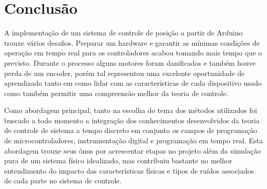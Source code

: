 \documentclass[a4paper,11pt]{article}
\begin{document}







\section{Conclusão}

A implementação de um sistema de controle de posição a partir de Arduino trouxe vários desafios. Preparar um hardware e garantir as mínimas condições de operação em tempo real para os controladores acabou tomando mais tempo que o previsto. Durante o processo alguns motores foram danificados e também houve perda de um encoder, porém tal representou uma excelente oportunidade de aprendizado tanto em como lidar com as características de cada dispositivo usado como também permitir uma compreensão melhor da teoria de controle.

Como abordagem principal, tanto na escolha do tema dos métodos utilizados foi buscado a todo momento a integração dos conhecimentos desenvolvidos da teoria de controle de sistema a tempo discreto em conjunto os campos de programação de microcontroladores, instrumentação digital e programação em tempo real. Esta abordagem trouxe seus ônus por acrescentar etapas no projeto além da simulação pura de um sistema físico idealizado, mas contribuiu bastante no melhor entendimento do impacto das características físicas e tipos de ruídos associados de cada parte no sistema de controle.


\newpage

\nocite{matlabcontrol}
\nocite{matlabsymbolic}
\nocite{ogata2010modern}
\nocite{nise2012}
\end{document}
